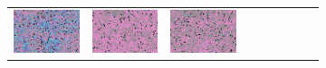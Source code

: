 \documentclass{ipol}
\begin{document}
\begin{figure}[ht]
\begin{subfigure}[t]{\linewidth}
\begin{tabular}{ccccccccc}
                \includegraphics[width=\s]{images/carnival/DHT/iso_j98_64_grids.png}&
                \includegraphics[width=\s]{images/carnival/LINEAR/iso_j98_64_grids.png}&
                \includegraphics[width=\s]{images/carnival/PPG/iso_j98_64_grids.png}&

\end{tabular}
\end{subfigure}
\end{figure}
\end{document}
